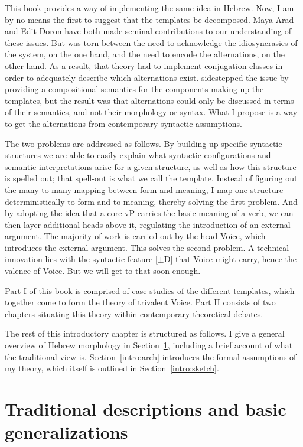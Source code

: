 \begin{exe}
\begin{xlist}
\begin{exe}
\begin{exe}
\begin{exe}
\begin{exe}
\begin{xlist}
\begin{exe}
\begin{xlist}
\begin{xlist}
\begin{xlist}
\begin{exe}
\begin{xlist}
This book provides a way of implementing the same idea in Hebrew. Now, I am by no means the first to suggest that the templates be decomposed. Maya Arad and Edit Doron have both made seminal contributions to our understanding of these issues. But \cite{arad05} was torn between the need to acknowledge the idiosyncrasies of the system, on the one hand, and the need to encode the alternations, on the other hand. As a result, that theory had to implement conjugation classes in order to adequately describe which alternations exist. \cite{doron03} sidestepped the issue by providing a compositional semantics for the components making up the templates, but the result was that alternations could only be discussed in terms of their semantics, and not their morphology or syntax. What I propose is a way to get the alternations from contemporary syntactic assumptions.

The two problems are addressed as follows. By building up specific syntactic structures we are able to easily explain what syntactic configurations and semantic interpretations arise for a given structure, as well as how this structure is spelled out; that spell-out is what we call the template. Instead of figuring out the many-to-many mapping between form and meaning, I map one structure deterministically to form and to meaning, thereby solving the first problem. And by adopting the idea that a core vP carries the basic meaning of a verb, we can then layer additional heads above it, regulating the introduction of an external argument. The majority of work is carried out by the head Voice, which introduces the external argument. This solves the second problem. A technical innovation lies with the syntactic feature [$\pm$D] that Voice might carry, hence the valence of Voice. But we will get to that soon enough.

Part I of this book is comprised of case studies of the different templates, which together come to form the theory of trivalent Voice. Part II consists of two chapters situating this theory within contemporary theoretical debates.

The rest of this introductory chapter is structured as follows. I give a general overview of Hebrew morphology in Section~\ref{intro:basic}, including a brief account of what the traditional view is. Section~\ref{intro:arch} introduces the formal assumptions of my theory, which itself is outlined in Section~\ref{intro:sketch}.


\section{Traditional descriptions and basic generalizations} \label{intro:basic}

\end{xlist}
\end{exe}
\end{xlist}
\end{xlist}
\end{xlist}
\end{exe}
\end{xlist}
\end{exe}
\end{exe}
\end{exe}
\end{exe}
\end{xlist}
\end{exe}
